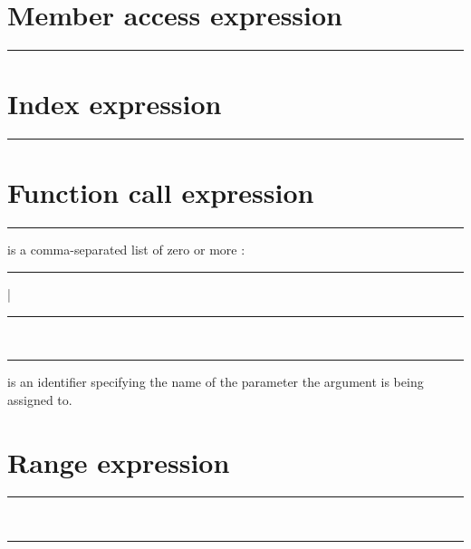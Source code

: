 \section{Member access expression}

\begin{grammar}
\rule{member-access-expression}   
\end{grammar}

\section{Index expression}

\begin{grammar}
\rule{index-expression}  \code{[}  \code{]}
\end{grammar}

\section{Function call expression}

\begin{grammar}
\rule{call-expression}  \code{(}  \code{)}
\end{grammar}

 is a comma-separated list of zero or more
:

\begin{grammar}
\rule{argument-specifier}  | \\
\rule{unnamed-argument} \\
\rule{named-argument}  \code{:} 
\end{grammar}

 is an identifier specifying the name of the
parameter the argument  is being assigned to.

\section{Range expression}

\begin{grammar}
\rule{exclusive-range-expression}   \\
\rule{inclusive-range-expression}   
\end{grammar}

